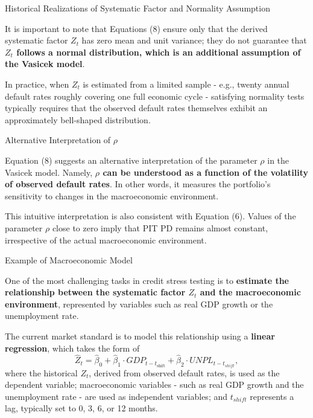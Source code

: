 \documentclass{beamer}
\begin{document}
\begin{frame}{Historical Realizations of Systematic Factor and Normality Assumption}
\justifying
\small

It is important to note that Equations (8) ensure only that the derived systematic factor $Z_t$ has zero mean and unit variance; they do not guarantee that \textbf{$Z_t$ follows a normal distribution, which is an additional assumption of the Vasicek model}. 

\medskip

In practice, when $Z_t$ is estimated from a limited sample - e.g., twenty annual default rates roughly covering one full economic cycle - satisfying normality tests typically requires that the observed default rates themselves exhibit an approximately bell-shaped distribution.
\end{frame}

\begin{frame}{Alternative Interpretation of $\rho$}
\justifying
\small

Equation (8) suggests an alternative interpretation of the parameter $\rho$ in the Vasicek model. Namely, \textbf{$\rho$ can be understood as a function of the volatility of observed default rates}. In other words, it measures the portfolio's sensitivity to changes in the macroeconomic environment.

\medskip

This intuitive interpretation is also consistent with Equation (6). Values of the parameter $\rho$ close to zero imply that PIT PD remains almost constant, irrespective of the actual macroeconomic environment.

\end{frame}

\begin{frame}{Example of Macroeconomic Model}
\justifying
\small

One of the most challenging tasks in credit stress testing is to \textbf{estimate the relationship between the systematic factor $Z_t$ and the macroeconomic environment}, represented by variables such as real GDP growth or the unemployment rate.

\medskip
 
The current market standard is to model this relationship using a \textbf{linear regression}, which takes the form of
\begin{equation*}
\widehat{Z}_t = \widehat{\beta}_0 + \widehat{\beta}_1 \cdot GDP_{t - t_{\mathrm{shift}}} + \widehat{\beta}_2 \cdot UNPL_{t - t_{shift}}, 
\end{equation*}
where the historical $Z_t$, derived from observed default rates, is used as the dependent variable; macroeconomic variables - such as real GDP growth and the unemployment rate - are used as independent variables; and $t_{shift}$ represents a lag, typically set to 0, 3, 6, or 12 months.

\end{frame}
\end{document}
